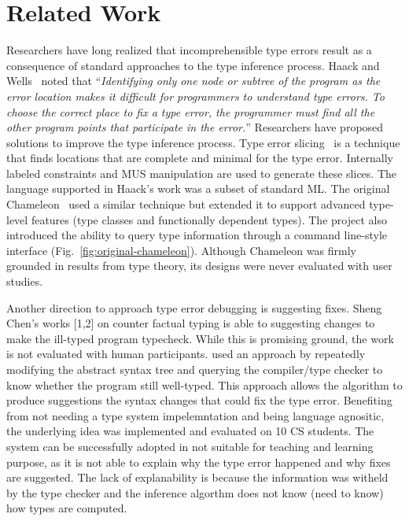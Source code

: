 \section{Related Work}

Researchers have long realized that incomprehensible type errors result as a consequence of standard approaches to the type inference process. Haack and Wells~\cite{haack2004type} noted that ``\textit{Identifying only one node or subtree of the program as the error location makes it difficult for programmers to understand type errors. To choose the correct place to fix a type error, the programmer must find all the other program points that participate in the error.}'' Researchers have proposed solutions to improve the type inference process. Type error slicing~\cite{haack2004type} is a technique that finds locations that are complete and minimal for the type error. Internally labeled constraints and MUS manipulation are used to generate these slices. The language supported in Haack's work was a subset of standard ML. The original Chameleon~\cite{stuckey2003interactive} used a similar technique but extended it to support advanced type-level features (type classes and functionally dependent types). The project also introduced the ability to query type information through a command line-style interface (Fig.~\ref{fig:original-chameleon}). Although Chameleon was firmly grounded in results from type theory, its designs were never evaluated with user studies.

Another direction to approach type error debugging is suggesting fixes. Sheng Chen's works [1,2] on counter factual typing is able to suggesting changes to make the ill-typed program typecheck. While this is promising ground, the work is not evaluated with human participants.  \cite{lerner2007searchingtypeerror} used an approach by repeatedly modifying the abstract syntax tree and querying the compiler/type checker to know whether the program still well-typed. This approach allows the algorithm to produce suggestions the syntax changes that could fix the type error. Benefiting from not needing a type system impelemntation and being language agnositic, the underlying idea was implemented and evaluated on 10 CS students. The system can be successfully adopted in not suitable for teaching and learning purpose, as it is not able to explain why the type error happened and why fixes are suggested. The lack of explanability is because the information was witheld by the type checker and the inference algorthm does not know (need to know) how types are computed.

